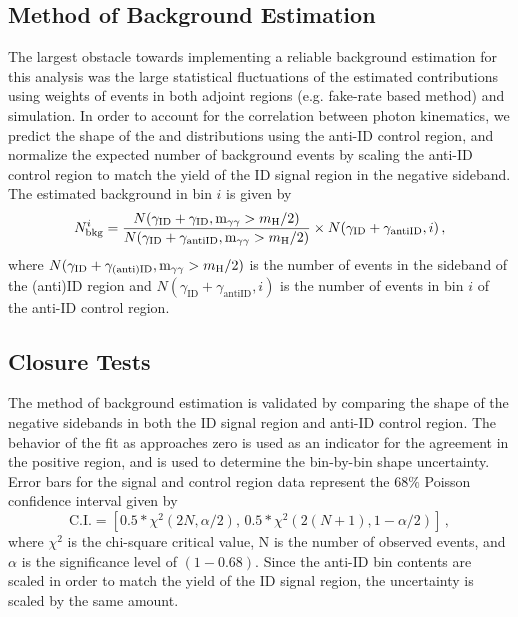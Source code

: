 \subsection{Method of Background Estimation} \label{sec:ana_bkgest}
The largest obstacle towards implementing a reliable background estimation for this analysis was the large statistical fluctuations of the estimated contributions using weights of events in both adjoint regions (e.g. fake-rate based method) and simulation. In order to account for the correlation between photon kinematics, we predict the shape of the \lxy and \mgg distributions using the anti-ID control region, and normalize the expected number of background events by scaling the anti-ID control region to match the yield of the ID signal region in the negative \lxy sideband. The estimated background in bin $i$ is given by
\begin{equation}
	\label{eq:background}
	N_{\mathrm{bkg}}^{i} = \frac{N(\gamma_\mathrm{ID}+\gamma_\mathrm{ID}, \text{m}_{\gamma\gamma} > m_{\mathrm{H}}\space/2)}{N(\gamma_\mathrm{ID}+\gamma_\mathrm{antiID}, \text{m}_{\gamma\gamma} > m_{\mathrm{H}}\space/2)}\times N(\gamma_\mathrm{ID}+\gamma_\mathrm{antiID}, i)\,,
\end{equation}
where $N(\gamma_\mathrm{ID}+\gamma_\mathrm{(anti)ID}, \text{m}_{\gamma\gamma} > m_{\mathrm{H}}\space/2)$ is the number of events in the \lxy sideband of the (anti)ID region and $N(\gamma_\mathrm{ID}+\gamma_\mathrm{antiID}, i)$ is the number of events in bin $i$ of the anti-ID control region. 

\subsection{Closure Tests} \label{sec:ana_bkgclosure}
The method of background estimation is validated by comparing the shape of the negative \lxy sidebands in both the ID signal region and anti-ID control region. The behavior of the fit as \lxy approaches zero is used as an indicator for the agreement in the positive \lxy region, and is used to determine the bin-by-bin shape uncertainty. Error bars for the signal and control region data represent the $68\%$ Poisson confidence interval given by
\begin{equation}
	\text{C.I.}=\left[0.5*\chi^2(2N, \alpha/2),\, 0.5*\chi^2(2(N+1), 1-\alpha/2)\right]\,,
\end{equation}
where $\chi^2$ is the chi-square critical value, N is the number of observed events, and $\alpha$ is the significance level of $(1-0.68)$. Since the anti-ID bin contents are scaled in order to match the yield of the ID signal region, the uncertainty is scaled by the same amount.

